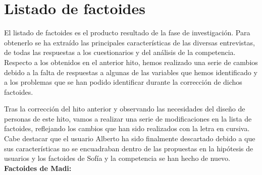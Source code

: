 \section{Listado de factoides}
El listado de factoides es el producto resultado de la fase de investigación. Para obtenerlo se ha extraído las principales características de las
diversas entrevistas, de todas las respuestas a los cuestionarios y del análisis de la competencia. Respecto a los obtenidos en el anterior hito,
hemos realizado una serie de cambios debido a la falta de respuestas a algunas de las variables que hemos identificado y a los problemas que se
han podido identificar durante la corrección de dichos factoides.


Tras la corrección del hito anterior y observando las necesidades del diseño de personas de este hito, vamos a realizar una serie de modificaciones
en la lista de factoides, reflejando los cambios que han sido realizados con la letra en cursiva. Cabe destacar que el usuario Alberto ha sido finalmente
descartado debido a que sus características no se encuadraban dentro de las propuestas en la hipótesis de usuarios y los factoides de Sofía y la competencia se han hecho de nuevo. \\

\textbf{Factoides de Madi:}

